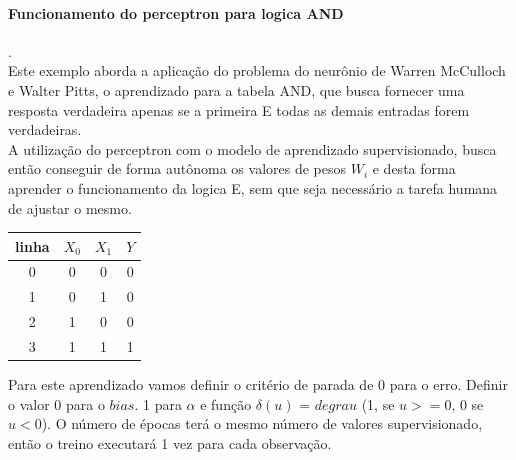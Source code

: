 \documentclass[	12pt, Times, openright, twoside, a4paper, english, brazil]{abntex2}
\begin{document}
        \paragraph* {Funcionamento do perceptron para logica AND}.\\
		 Este exemplo aborda a aplicação do problema do neurônio de Warren McCulloch e Walter Pitts, o aprendizado para a tabela AND, que busca fornecer uma resposta verdadeira apenas se a primeira E todas as demais entradas forem verdadeiras.\\            	
        A utilização do perceptron com o modelo de aprendizado supervisionado, busca então conseguir de forma autônoma os valores de pesos $W_i$ e desta forma aprender o funcionamento da logica E, sem que seja necessário a tarefa humana de ajustar o mesmo.\\
                 \begin{table}[!ht]
                 \centering
  				  \begin{tabular}{|c|c|c|c|}
  				 	\hline  \textbf{linha} & \textbf{$X_0$} & \textbf{$X_1$} &  \textbf{$Y$}\\
  				 	\hline 0 & 0 & 0 & 0\\
  				 	\hline 1 & 0 & 1 & 0\\
  				 	\hline 2 & 1 & 0 & 0\\
  				 	\hline 3 & 1 & 1 & 1\\
  				  \end{tabular}
                \end{table}
					
  Para este aprendizado vamos definir o critério de parada de 0 para o erro. 
  Definir o valor 0 para o $bias$. 
  1 para $\alpha$ e 
  função $\delta(u)$ = $degrau$ (1, se $u>=0$, 0 se $u<0$).
  O número de épocas terá o mesmo número de valores supervisionado, então o treino executará 1 vez para cada observação.
  			 	   
\end{document}
